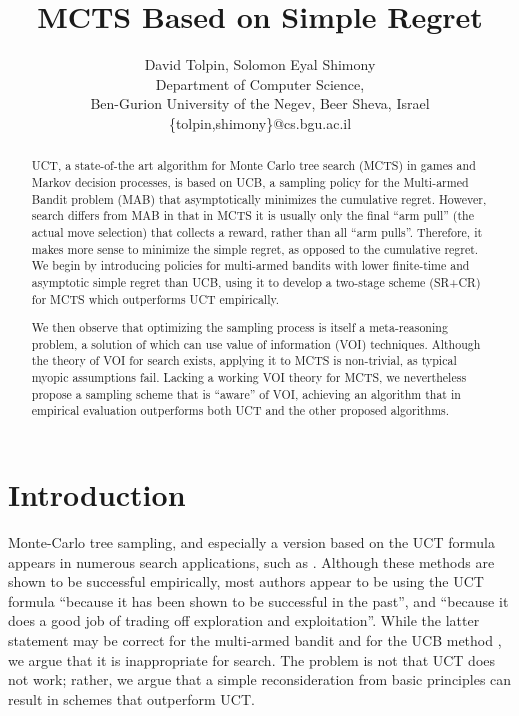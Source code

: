 \documentclass[letterpaper]{article}
\title{MCTS Based on Simple Regret}
\author {David Tolpin, Solomon Eyal Shimony \\
Department of Computer Science, \\
Ben-Gurion University of the Negev, Beer Sheva, Israel \\
\{tolpin,shimony\}@cs.bgu.ac.il}
\begin{document}
\maketitle

\begin{abstract}
UCT, a state-of-the art algorithm for Monte Carlo tree search (MCTS)
in games and Markov decision processes, is based on UCB, a sampling
policy for the Multi-armed Bandit problem (MAB) that asymptotically
minimizes the cumulative regret.  However, search differs from MAB in
that in MCTS it is usually only the final ``arm pull'' (the actual
move selection) that collects a reward, rather than all ``arm pulls''.
Therefore, it makes more sense to minimize the simple regret, as
opposed to the cumulative regret. We begin by introducing policies for
multi-armed bandits with lower finite-time and asymptotic simple
regret than UCB, using it to develop a two-stage scheme (SR+CR) for MCTS
which outperforms UCT empirically.

We then observe that optimizing the sampling process is itself a
meta-reasoning problem, a solution of which can use value of
information (VOI) techniques.  Although the theory of VOI for search
exists, applying it to MCTS is non-trivial, as typical myopic
assumptions fail. Lacking a working VOI theory for MCTS, we
nevertheless propose a sampling scheme that is ``aware'' of VOI,
achieving an algorithm that in empirical evaluation outperforms 
both UCT and the other proposed algorithms.
\end{abstract}

\section{Introduction}

Monte-Carlo tree sampling, and especially a version based on the
UCT formula \cite{Kocsis.uct} appears in numerous search applications,
such as \cite{Eyerich.ctp}. Although these methods are shown to be successful empirically,
most authors appear to be using the UCT formula ``because it has been shown
to be successful in the past'', and ``because it does a good job of
trading off exploration and exploitation''. While the latter statement may be
correct for the multi-armed bandit and for the UCB method \cite{Auer.ucb},
we argue that it is inappropriate for search. The problem is not that
UCT does not work; rather, we argue that a simple reconsideration from basic
principles can result in schemes that outperform UCT.
\end{document}
